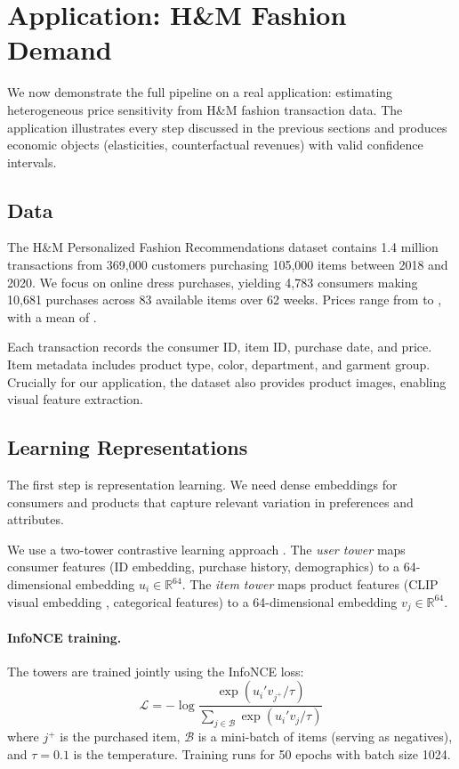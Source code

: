 \section{Application: H\&M Fashion Demand}\label{sec:application}

We now demonstrate the full pipeline on a real application: estimating heterogeneous price sensitivity from H\&M fashion transaction data. The application illustrates every step discussed in the previous sections and produces economic objects (elasticities, counterfactual revenues) with valid confidence intervals.

\subsection{Data}

The H\&M Personalized Fashion Recommendations dataset \citep{hm2022kaggle} contains 1.4 million transactions from 369,000 customers purchasing 105,000 items between 2018 and 2020. We focus on online dress purchases, yielding 4,783 consumers making 10,681 purchases across 83 available items over 62 weeks. Prices range from  to , with a mean of .

Each transaction records the consumer ID, item ID, purchase date, and price. Item metadata includes product type, color, department, and garment group. Crucially for our application, the dataset also provides product images, enabling visual feature extraction.

\subsection{Learning Representations}\label{sec:embeddings}

The first step is representation learning. We need dense embeddings for consumers and products that capture relevant variation in preferences and attributes.

We use a two-tower contrastive learning approach \citep{oord2018representation, yi2019sampling}. The \emph{user tower} maps consumer features (ID embedding, purchase history, demographics) to a 64-dimensional embedding $u_i \in \mathbb{R}^{64}$. The \emph{item tower} maps product features (CLIP visual embedding \citep{radford2021learning}, categorical features) to a 64-dimensional embedding $v_j \in \mathbb{R}^{64}$.

\paragraph{InfoNCE training.} The towers are trained jointly using the InfoNCE loss:
\begin{equation}
    \mathcal{L} = -\log \frac{\exp(u_i' v_{j^+} / \tau)}{\sum_{j \in \mathcal{B}} \exp(u_i' v_j / \tau)}
\end{equation}
where $j^+$ is the purchased item, $\mathcal{B}$ is a mini-batch of items (serving as negatives), and $\tau = 0.1$ is the temperature. Training runs for 50 epochs with batch size 1024.

